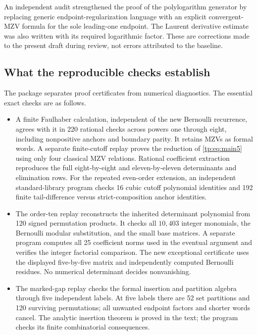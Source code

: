 \documentclass[11pt,a4paper]{article}
\numberwithin{equation}{section}
\theoremstyle{definition}
\theoremstyle{remark}
\begin{document}
An independent audit strengthened the proof of the polylogarithm
generator by replacing generic endpoint-regularization language with
an explicit convergent-MZV formula for the sole leading-one endpoint.
The Laurent derivative estimate was also written with its required
logarithmic factor. These are corrections made to the present draft
during review, not errors attributed to the baseline.

\subsection{What the reproducible checks establish}

The package separates proof certificates from numerical diagnostics.
The essential exact checks are as follows.

\begin{itemize}
\item A finite Faulhaber calculation, independent of the new Bernoulli
recurrence, agrees with it in 220 rational checks across powers one
through eight, including nonpositive anchors and boundary parity.
It retains MZVs as formal words. A separate finite-cutoff replay proves
the reduction of \eqref{tp:eq:main5} using only four classical MZV
relations. Rational coefficient extraction reproduces the full
eight-by-eight and eleven-by-eleven determinants and elimination rows.
For the repeated even-order extension, an independent standard-library
program checks 16 cubic cutoff polynomial identities and 192 finite
tail-difference versus strict-composition anchor identities.

\item The order-ten replay reconstructs the inherited determinant
polynomial from 120 signed permutation products. It checks all
$10{,}403$ integer monomials, the Bernoulli modular substitution,
and the small base matrices. A separate program computes all 25
coefficient norms used in the eventual argument and verifies the
integer factorial comparison. The new exceptional certificate uses
the displayed five-by-five matrix and independently computed Bernoulli
residues. No numerical determinant decides nonvanishing.

\item The marked-gap replay checks the formal insertion and partition
algebra through five independent labels. At five labels there are 52
set partitions and 120 surviving permutations; all unwanted endpoint
factors and shorter words cancel. The analytic insertion theorem is
proved in the text; the program checks its finite combinatorial
consequences.
\end{itemize}
\end{document}
